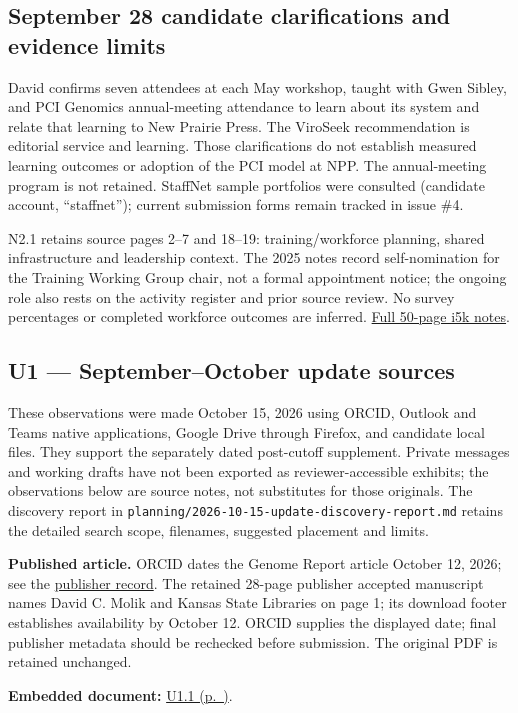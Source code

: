 \subsection{September 28 candidate clarifications and evidence limits}
David confirms seven attendees at each May workshop, taught with Gwen Sibley,
and PCI Genomics annual-meeting attendance to learn about its system and relate
that learning to New Prairie Press. The ViroSeek recommendation is editorial
service and learning. Those clarifications do not establish measured learning
outcomes or adoption of the PCI model at NPP. The annual-meeting program is not
retained. StaffNet sample portfolios were consulted (candidate account,
``staffnet''); current submission forms remain tracked in issue \#4.

N2.1 retains source pages 2--7 and 18--19: training/workforce planning, shared
infrastructure and leadership context. The 2025 notes record self-nomination
for the Training Working Group chair, not a formal appointment notice; the
ongoing role also rests on the activity register and prior source review.
No survey percentages or completed workforce outcomes are inferred.
\href{https://github.com/user-attachments/files/32247777/i5k.exec.notes.pdf}{Full 50-page i5k notes}.

\hypertarget{evidence-U1}{}
\subsection{U1 --- September--October update sources}
These observations were made October 15, 2026 using ORCID, Outlook and Teams
native applications, Google Drive through Firefox, and candidate local files.
They support the separately dated post-cutoff supplement. Private messages and
working drafts have not been exported as reviewer-accessible exhibits; the
observations below are source notes, not substitutes for those originals.
The discovery report in \texttt{planning/2026-10-15-update-discovery-report.md}
retains the detailed search scope, filenames, suggested placement and limits.

\textbf{Published article.} ORCID dates the Genome Report article October 12,
2026; see the \href{https://doi.org/10.1093/gbe/evag258}{publisher record}.
The retained 28-page publisher accepted manuscript names David C. Molik and
Kansas State Libraries on page 1; its download footer establishes availability
by October 12. ORCID supplies the displayed date; final publisher metadata
should be rechecked before submission. The original PDF is retained unchanged.
\par\medskip\noindent\textbf{Embedded document:}
\hyperref[supplement-U1.1]{U1.1 (p.~\pageref{supplement-U1.1})}.

